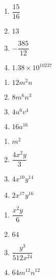 \begin{multicols}{4}
\begin{enumerate}
\setcounter{enumi}{\value{HW}}

\item $\dfrac{15}{16}$
\item $13$
\item $-\dfrac{385}{12}$
\item $1.38 \times 10^{10237}$
\setcounter{HW}{\value{enumi}}
\end{enumerate}
\end{multicols}


\begin{multicols}{4}
\begin{enumerate}
\setcounter{enumi}{\value{HW}}

\item $12 m^2 n$
\item $8 m^6 n^3$
\item $4 u^6 v^4$
\item $16 a^{16}$

\setcounter{HW}{\value{enumi}}
\end{enumerate}
\end{multicols}

\begin{multicols}{4}
\begin{enumerate}
\setcounter{enumi}{\value{HW}}

\item $m^2$
\item $\dfrac{4 x^2 y}{3}$
\item $4 x^{10} y^{14}$
\item $2 x^{17} y^{16}$

\setcounter{HW}{\value{enumi}}
\end{enumerate}
\end{multicols}

\begin{multicols}{4}
\begin{enumerate}
\setcounter{enumi}{\value{HW}}

\item $\dfrac{x^2 y}{6}$
\item $64$
\item $\dfrac{y^3}{512 x^{24}}$
\item $64 m^{12} n^{12}$

\setcounter{HW}{\value{enumi}}
\end{enumerate}
\end{multicols}

